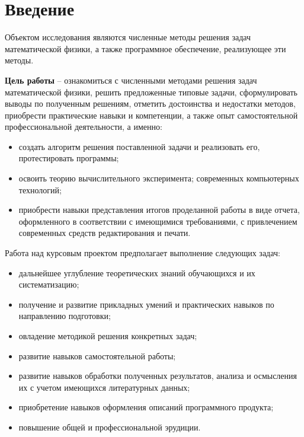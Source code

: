 \section{Введение}
Объектом исследования являются численные методы решения задач математической физики, а также программное обеспечение, реализующее эти методы.

\textbf{Цель работы} – ознакомиться с численными методами решения задач математической физики, решить предложенные типовые задачи, сформулировать выводы по полученным решениям, отметить достоинства и недостатки методов, приобрести практические навыки и компетенции, а также опыт самостоятельной профессиональной деятельности, а именно:
\begin{itemize}
    \item создать алгоритм решения поставленной задачи и реализовать его, протестировать программы;
    \item освоить теорию вычислительного эксперимента; современных компьютерных технологий; 
    \item приобрести навыки представления итогов проделанной работы в виде отчета, оформленного в соответствии с имеющимися требованиями, с привлечением современных средств редактирования и печати.
\end{itemize}

\noindent Работа над курсовым проектом предполагает выполнение следующих задач:
\begin{itemize}
    \item дальнейшее углубление теоретических знаний обучающихся и их систематизацию;
    \item получение и развитие прикладных умений и практических навыков по направлению подготовки;
    \item овладение методикой решения конкретных задач;
    \item развитие навыков самостоятельной работы;
    \item развитие навыков обработки полученных результатов, анализа и осмысления их с учетом имеющихся литературных данных;
    \item приобретение навыков оформления описаний программного продукта;
    \item повышение общей и профессиональной эрудиции.
\end{itemize}